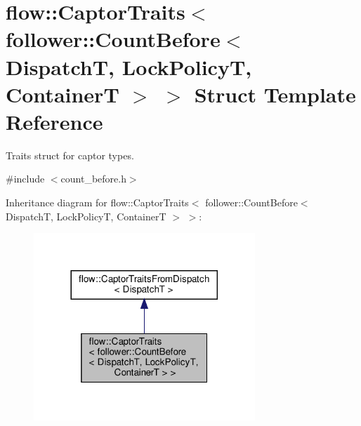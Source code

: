 \hypertarget{structflow_1_1_captor_traits_3_01follower_1_1_count_before_3_01_dispatch_t_00_01_lock_policy_t_00_01_container_t_01_4_01_4}{}\section{flow\+:\+:Captor\+Traits$<$ follower\+:\+:Count\+Before$<$ DispatchT, Lock\+PolicyT, ContainerT $>$ $>$ Struct Template Reference}
\label{structflow_1_1_captor_traits_3_01follower_1_1_count_before_3_01_dispatch_t_00_01_lock_policy_t_00_01_container_t_01_4_01_4}


Traits struct for captor types.  




{\ttfamily \#include $<$count\+\_\+before.\+h$>$}



Inheritance diagram for flow\+:\+:Captor\+Traits$<$ follower\+:\+:Count\+Before$<$ DispatchT, Lock\+PolicyT, ContainerT $>$ $>$\+:\nopagebreak
\begin{figure}[H]
\begin{center}
\leavevmode
\includegraphics[width=236pt]{structflow_1_1_captor_traits_3_01follower_1_1_count_before_3_01_dispatch_t_00_01_lock_policy_t_0df78b400173407aebeafe326aa328a77}
\end{center}
\end{figure}


